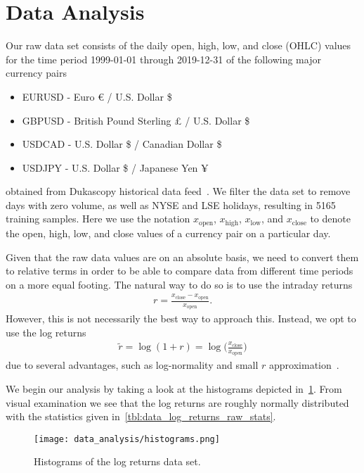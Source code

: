 \section{Data Analysis}
Our raw data set consists of the daily open, high, low, and close (OHLC) values for the time period 1999-01-01 through 2019-12-31 of the following major currency pairs
\begin{itemize}
    \item EURUSD - Euro € / U.S. Dollar \$
    \item GBPUSD - British Pound Sterling £ / U.S. Dollar \$
    \item USDCAD - U.S. Dollar \$ / Canadian Dollar \$
    \item USDJPY - U.S. Dollar \$ / Japanese Yen ¥
\end{itemize}
obtained from Dukascopy historical data feed~\cite{dukascopy}.
We filter the data set to remove days with zero volume, as well as NYSE and LSE holidays, resulting in 5165 training samples.
Here we use the notation \( x_\text{open} \), \( x_\text{high} \), \( x_\text{low} \), and \( x_\text{close} \) to denote the open, high, low, and close values of a currency pair on a particular day.

Given that the raw data values are on an absolute basis, we need to convert them to relative terms in order to be able to compare data from different time periods on a more equal footing.
The natural way to do so is to use the intraday returns
\begin{align}
    r = \frac{x_\text{close} - x_\text{open}}{x_\text{open}}.
\end{align}
However, this is not necessarily the best way to approach this.
Instead, we opt to use the log returns
\begin{align}
    \tilde{r}
        = \log(1+r)
        = \log\bigg( \frac{x_\text{close}}{x_\text{open}} \bigg)
\end{align}
due to several advantages, such as log-normality and small \( r \) approximation~\cite{quantivity_2012}.

We begin our analysis by taking a look at the histograms depicted in~\cref{fig:histograms_raw}.
From visual examination we see that the log returns are roughly normally distributed with the statistics given in~\cref{tbl:data_log_returns_raw_stats}.
\begin{figure}[!htb]
    \begin{center}
        \texttt{[image: data\_analysis/histograms.png]}
    \end{center}
    \caption{Histograms of the log returns data set.}
    \label{fig:histograms_raw}
\end{figure}

